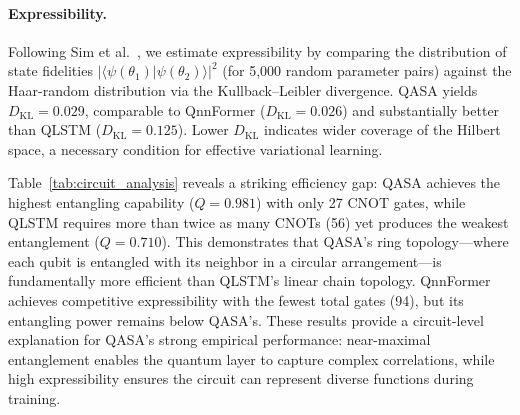 \documentclass[conference]{IEEEtran}
\begin{document}
\paragraph{Expressibility.}
Following Sim et al.~\cite{sim2019expressibility}, we estimate expressibility by comparing the distribution of state fidelities $|\langle \psi(\theta_1) | \psi(\theta_2) \rangle|^2$ (for 5{,}000 random parameter pairs) against the Haar-random distribution via the Kullback--Leibler divergence. QASA yields $D_{\mathrm{KL}} = 0.029$, comparable to QnnFormer ($D_{\mathrm{KL}} = 0.026$) and substantially better than QLSTM ($D_{\mathrm{KL}} = 0.125$). Lower $D_{\mathrm{KL}}$ indicates wider coverage of the Hilbert space, a necessary condition for effective variational learning.

\begin{table}[h]
\centering
\caption{Comparative quantum circuit analysis across all three quantum models (5{,}000 parameter samples for expressibility, 1{,}000 for entangling capability). Lower expressibility KL divergence indicates wider Hilbert space coverage; higher Meyer--Wallach $Q$ indicates stronger entanglement generation.}
\label{tab:circuit_analysis}
\end{table}

Table~\ref{tab:circuit_analysis} reveals a striking efficiency gap: QASA achieves the highest entangling capability ($Q = 0.981$) with only 27 CNOT gates, while QLSTM requires more than twice as many CNOTs (56) yet produces the weakest entanglement ($Q = 0.710$). This demonstrates that QASA's ring topology---where each qubit is entangled with its neighbor in a circular arrangement---is fundamentally more efficient than QLSTM's linear chain topology. QnnFormer achieves competitive expressibility with the fewest total gates (94), but its entangling power remains below QASA's. These results provide a circuit-level explanation for QASA's strong empirical performance: near-maximal entanglement enables the quantum layer to capture complex correlations, while high expressibility ensures the circuit can represent diverse functions during training.
\end{document}
